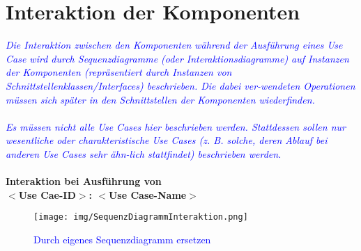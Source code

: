 \section{Interaktion der Komponenten}
\textcolor{blue}{\textit{Die Interaktion zwischen den Komponenten während der Ausführung eines Use Case wird durch Sequenzdiagramme (oder Interaktionsdiagramme) auf Instanzen der Komponenten (repräsentiert durch Instanzen von Schnittstellenklassen/Interfaces) beschrieben. Die dabei ver-wendeten Operationen müssen sich später in den Schnittstellen der Komponenten wiederfinden.\\\\Es müssen nicht alle Use Cases hier beschrieben werden. Stattdessen sollen nur wesentliche oder charakteristische  Use Cases  (z. B. solche, deren Ablauf bei anderen Use Cases sehr ähn-lich stattfindet) beschrieben werden.}}\\
\\
\textbf{Interaktion bei Ausführung von\\
$<$Use Cae-ID$>$: $<$Use Case-Name$>$}

\begin{figure}[H]
\centering
\texttt{[image: img/SequenzDiagrammInteraktion.png]}
\caption{\textcolor{blue}{Durch eigenes Sequenzdiagramm ersetzen}}
\label{SequenzDiagrammInteraktion}
\end{figure}
